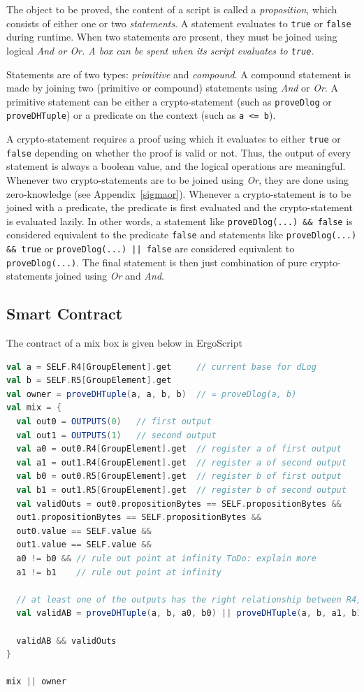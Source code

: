 \documentclass[runningheads]{llncs}
\begin{document}
The object to be proved, the content of a script is called a {\em proposition}, which consists of either one or two {\em statements}. A statement evaluates to \texttt{true} or \texttt{false} during
runtime. When two statements are present, they must be joined using logical \em{And} or \em{Or}. A box can be spent when its script evaluates to \texttt{true}.

Statements are of two types: {\em primitive} and {\em compound}. A compound statement is made by joining two (primitive or compound) statements using {\em And} or {\em Or}. A primitive statement can be either a {\en crypto-statement} (such as \texttt{proveDlog} or \texttt{proveDHTuple}) or a predicate on the context (such as \texttt{a <= b}).

A crypto-statement requires a proof using which it evaluates to either \texttt{true} or \texttt{false} depending on whether the proof is valid or not.
Thus, the output of every statement is always a boolean value, and the logical operations are meaningful.
Whenever two crypto-statements are to be joined using {\em Or}, they are done using zero-knowledge (see  Appendix~\ref{sigmaor}).
Whenever a crypto-statement is to be joined with a predicate, the predicate is first evaluated and the crypto-statement is evaluated lazily. In other words, a statement like \texttt{proveDlog(...) \&\& false} is considered equivalent to the predicate \texttt{false} and statements like \texttt{proveDlog(...) \&\& true} or \texttt{proveDlog(...) || false} are considered equivalent to \texttt{proveDlog(...)}. The final statement is then just combination of pure crypto-statements joined using {\em Or} and {\em And}.

\subsection{Smart Contract}
\label{smart-contract}

The contract of a mix box is given below in ErgoScript
\begin{lstlisting}[language=Scala,caption={Mix-script},label=mixScript]
val a = SELF.R4[GroupElement].get     // current base for dLog
val b = SELF.R5[GroupElement].get
val owner = proveDHTuple(a, a, b, b)  // = proveDlog(a, b)
val mix = {
  val out0 = OUTPUTS(0)   // first output
  val out1 = OUTPUTS(1)   // second output
  val a0 = out0.R4[GroupElement].get  // register a of first output
  val a1 = out1.R4[GroupElement].get  // register a of second output
  val b0 = out0.R5[GroupElement].get  // register b of first output
  val b1 = out1.R5[GroupElement].get  // register b of second output
  val validOuts = out0.propositionBytes == SELF.propositionBytes &&
  out1.propositionBytes == SELF.propositionBytes &&
  out0.value == SELF.value &&
  out1.value == SELF.value &&
  a0 != b0 && // rule out point at infinity ToDo: explain more
  a1 != b1    // rule out point at infinity

  // at least one of the outputs has the right relationship between R4, R5
  val validAB = proveDHTuple(a, b, a0, b0) || proveDHTuple(a, b, a1, b1)

  validAB && validOuts
}

mix || owner
\end{lstlisting}
\end{document}
